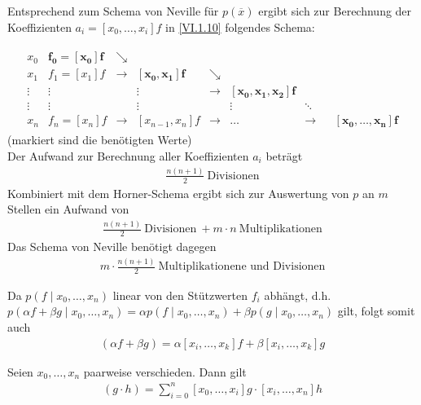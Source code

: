 Entsprechend zum Schema von Neville für $p(\overline{x})$
ergibt sich zur Berechnung der Koeffizienten $a_i=[x_0,\dots,x_i]f$
in \eqref{VI.1.10} folgendes Schema:

\begin{gather*}
  \begin{array}{ccccccccc}
    x_0 & \boldsymbol{f_0=[x_0]f} & \searrow\\
    x_1 & f_1=[x_1]f& \rightarrow &\boldsymbol{ [x_0,x_1]f}&\searrow \\
    \vdots&\vdots &&\vdots &\rightarrow & \boldsymbol{[x_0,x_1,x_2]f}\\
    \vdots&\vdots &&\vdots &&\vdots&\ddots\\
    x_n& f_n=[x_n]f &\rightarrow&[x_{n-1},x_n]f&\rightarrow &
                                                              \dots &\rightarrow && \boldsymbol{[x_0,\dots,x_n]f}
  \end{array}
\end{gather*}
(markiert sind die benötigten Werte)\\
Der Aufwand zur Berechnung aller Koeffizienten $a_i$ beträgt
\begin{gather*}
  \frac{n(n+1)}{2} ~\text{Divisionen}
\end{gather*}
Kombiniert mit dem Horner-Schema ergibt sich
zur Auswertung von $p$ an $m$ Stellen ein Aufwand von
\begin{gather*}
  \frac{n(n+1)}{2} ~\text{Divisionen}
  ~+m\cdot n   ~\text{Multiplikationen}
\end{gather*}
Das Schema von Neville benötigt dagegen
\begin{gather*}
  m\cdot\frac{n(n+1)}{2} ~\text{Multiplikationene und Divisionen}
\end{gather*}

\begin{Beme}
  Da $p(f\mid  x_0,\dots, x_n)$ linear von den Stützwerten $f_i$
  abhängt,
  d.h. $p(\alpha f+\beta g\mid  x_0,\dots, x_n)= 
  \alpha p(f\mid  x_0,\dots, x_n)+\beta p(g\mid  x_0,\dots, x_n)$
  gilt, folgt somit auch
  \begin{gather*}
    [x_i,\dots, x_k](\alpha f+\beta g)
    =  \alpha [x_i,\dots, x_k]f+\beta [x_i,\dots, x_k]g 
  \end{gather*}
\end{Beme}


\begin{Satze}\label{6.1.10}
  Seien $x_0,\dots, x_n$ paarweise verschieden. Dann gilt
  \begin{gather}
    [x_0,\dots, x_n] (g\cdot h) = \sum_{i=0}^{n}[x_0,\dots,x_i]g\cdot [x_i,\dots,x_n]h
    \label{VI.1.14}
  \end{gather}
\end{Satze}


